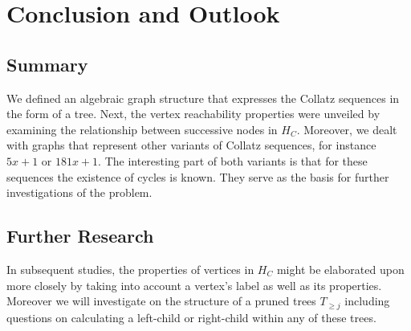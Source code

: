 \chapter{Conclusion and Outlook}

\section{Summary}
We defined an algebraic graph structure that expresses the Collatz sequences in the form of a tree. Next, the vertex reachability properties were unveiled by examining the relationship between successive nodes in $H_C$. Moreover, we dealt with graphs that represent other variants of Collatz sequences, for instance $5x+1$ or $181x+1$. The interesting part of both variants is that for these sequences the existence of cycles is known. They serve as the basis for further investigations of the problem.

\section{Further Research}
In subsequent studies, the properties of vertices in $H_C$ might be elaborated upon more closely by taking into account a vertex's label as well as its properties. Moreover we will investigate on the structure of a pruned trees $T_{\ge j}$ including questions on calculating a left-child or right-child within any of these trees.